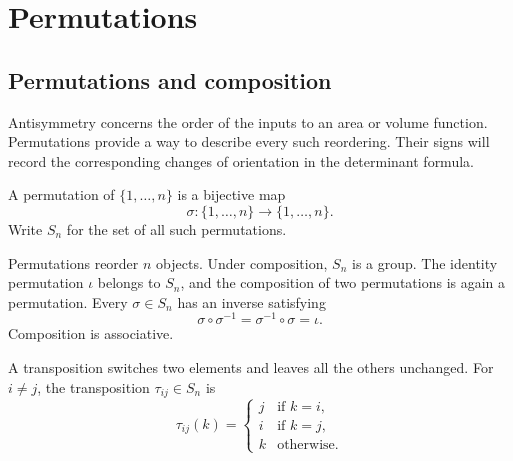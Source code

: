 \section{Permutations}
\label{sec:linear-algebra-i:permutations}

\subsection{Permutations and composition}

Antisymmetry concerns the order of the inputs to an area or volume
function. Permutations provide a way to describe every such reordering.
Their signs will record the corresponding changes of orientation in
the determinant formula.

\begin{definition}
  A permutation of \(\{1,\ldots,n\}\) is a bijective map
  \[
    \sigma:\{1,\ldots,n\}\longrightarrow\{1,\ldots,n\}.
  \]
  Write \(S_n\) for the set of all such permutations.
\end{definition}

Permutations reorder \(n\) objects. Under composition, \(S_n\) is a group.
The identity permutation \(\iota\) belongs to \(S_n\), and the composition
of two permutations is again a permutation. Every \(\sigma\in S_n\) has
an inverse satisfying
\[
  \sigma\circ\sigma^{-1}=\sigma^{-1}\circ\sigma=\iota.
\]
Composition is associative.

\begin{definition}
  A transposition switches two elements and leaves all the others unchanged.
  For \(i\ne j\), the transposition \(\tau_{ij}\in S_n\) is
  \[
    \tau_{ij}(k)=
    \begin{cases}
      j & \text{if \(k=i\)},\\
      i & \text{if \(k=j\)},\\
      k & \text{otherwise}.
    \end{cases}
  \]
\end{definition}

